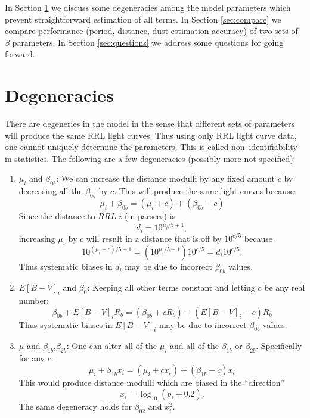 \documentclass[12pt]{article}
\begin{document}
In Section \ref{sec:nonident} we discuss some degeneracies among the model parameters which prevent straightforward estimation of all terms. In Section \ref{sec:compare} we compare performance (period, distance, dust estimation accuracy) of two sets of $\beta$ parameters. In Section \ref{sec:questions} we address some questions for going forward.

\section{Degeneracies}
\label{sec:nonident}

There are degeneries in the model in the sense that different sets of parameters will produce the same RRL light curves. Thus using only RRL light curve data, one cannot uniquely determine the parameters. This is called non--identifiability in statistics. The following are a few degeneracies (possibly more not specified):
\begin{enumerate}
\item $\mu_i$ and $\beta_{0b}$: We can increase the distance modulli by any fixed amount $c$ by decreasing all the $\beta_{0b}$ by $c$. This will produce the same light curves because:
  \begin{equation*}
    \mu_i + \beta_{0b} = (\mu_i + c) + (\beta_{0b}-c)
  \end{equation*}
  Since the distance to $RRL$ $i$ (in parsecs) is
  \begin{equation*}
    d_i = 10^{\mu_i/5 + 1},
  \end{equation*}
  increasing $\mu_i$ by $c$ will result in a distance that is off by $10^{c/5}$ because
  \begin{equation*}
   10^{(\mu_i + c)/5 + 1} = (10^{\mu_i/5 + 1})10^{c/5} = d_i10^{c/5}.
  \end{equation*}
  Thus systematic biases in $d_i$ may be due to incorrect $\beta_{0b}$ values.
\item $E[B-V]_i$ and $\beta_{0}$: Keeping all other terms constant and letting $c$ be any real number:
  \begin{equation*}
    \beta_{0b} + E[B-V]_iR_b = (\beta_{0b} + cR_b) + (E[B-V]_i-c)R_b
  \end{equation*}
  Thus systematic biases in $E[B-V]_i$ may be due to incorrect $\beta_{0b}$ values.
\item $\mu$ and $\beta_{1b}$,$\beta_{2b}$: One can alter all of the $\mu_i$ and all of the $\beta_{1b}$ or $\beta_{2b}$. Specifically for any $c$:
  \begin{equation*}
    \mu_i + \beta_{1b}x_i = (\mu_i + cx_i) + (\beta_{1b}-c)x_i
  \end{equation*}
  This would produce distance modulli which are biased in the ``direction''
  \begin{equation*}
    x_i=\log_{10}(p_i+0.2).
  \end{equation*}
  The same degeneracy holds for $\beta_{02}$ and $x_i^2$.
\end{enumerate}
\end{document}
